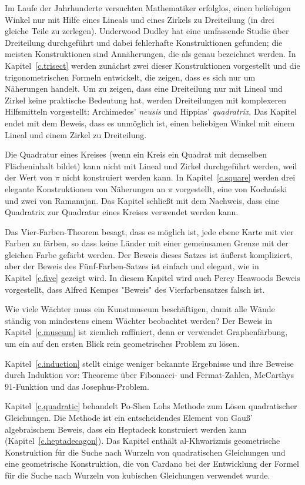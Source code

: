 Im Laufe der Jahrhunderte versuchten Mathematiker erfolglos, einen beliebigen Winkel nur mit Hilfe eines Lineals und eines Zirkels zu Dreiteilung (in drei gleiche Teile zu zerlegen). Underwood Dudley hat eine umfassende Studie über Dreiteilung durchgeführt und dabei fehlerhafte Konstruktionen gefunden; die meisten Konstruktionen sind Annäherungen, die als genau bezeichnet werden. In Kapitel~\ref{c.trisect} werden zunächst zwei dieser Konstruktionen vorgestellt und die trigonometrischen Formeln entwickelt, die zeigen, dass es sich nur um Näherungen handelt. Um zu zeigen, dass eine Dreiteilung nur mit Lineal und Zirkel keine praktische Bedeutung hat, werden Dreiteilungen mit komplexeren Hilfsmitteln vorgestellt: Archimedes' \emph{neusis} und Hippias' \emph{quadratrix}. Das Kapitel endet mit dem Beweis, dass es unmöglich ist, einen beliebigen Winkel mit einem Lineal und einem Zirkel zu Dreiteilung. 

Die Quadratur eines Kreises (wenn ein Kreis ein Quadrat mit demselben Flächeninhalt bildet) kann nicht mit Lineal und Zirkel durchgeführt werden, weil der Wert von $\pi$ nicht konstruiert werden kann. In Kapitel~\ref{c.square} werden drei elegante Konstruktionen von Näherungen an $\pi$ vorgestellt, eine von Kocha\'{n}ski und zwei von Ramanujan. Das Kapitel schließt mit dem Nachweis, dass eine Quadratrix zur Quadratur eines Kreises verwendet werden kann.

Das Vier-Farben-Theorem besagt, dass es möglich ist, jede ebene Karte mit vier Farben zu färben, so dass keine Länder mit einer gemeinsamen Grenze mit der gleichen Farbe gefärbt werden. Der Beweis dieses Satzes ist äußerst kompliziert, aber der Beweis des Fünf-Farben-Satzes ist einfach und elegant, wie in Kapitel~\ref{c.five} gezeigt wird. In diesem Kapitel wird auch Percy Heawoods Beweis vorgestellt, dass Alfred Kempes "Beweis" des Vierfarbensatzes falsch ist.

Wie viele Wächter muss ein Kunstmuseum beschäftigen, damit alle Wände ständig von mindestens einem Wächter beobachtet werden? Der Beweis in Kapitel~\ref{c.museum} ist ziemlich raffiniert, denn er verwendet Graphenfärbung, um ein auf den ersten Blick rein geometrisches Problem zu lösen.

Kapitel~\ref{c.induction} stellt einige weniger bekannte Ergebnisse und ihre Beweise durch Induktion vor: Theoreme über Fibonacci- und Fermat-Zahlen, McCarthys $91$-Funktion und das Josephus-Problem.

Kapitel~\ref{c.quadratic} behandelt Po-Shen Lohs Methode zum Lösen quadratischer Gleichungen. Die Methode ist ein entscheidendes Element von Gauß' algebraischem Beweis, dass ein Heptadeck konstruiert werden kann (Kapitel~\ref{c.heptadecagon}). Das Kapitel enthält al-Khwarizmis geometrische Konstruktion für die Suche nach Wurzeln von quadratischen Gleichungen und eine geometrische Konstruktion, die von Cardano bei der Entwicklung der Formel für die Suche nach Wurzeln von kubischen Gleichungen verwendet wurde.

